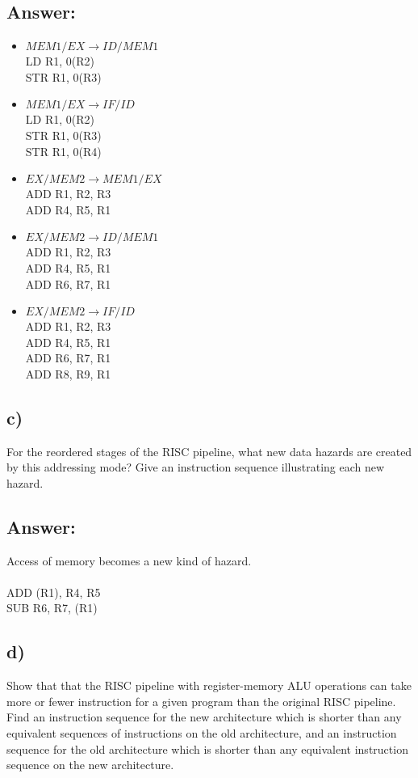 \documentclass[letter,11pt,leqno]{article}
\begin{document}
\subsection*{Answer:}

\begin{itemize}
\item $MEM1/EX\to{}ID/MEM1$\\
LD R1, 0(R2)\\
STR R1, 0(R3)

\item $MEM1/EX\to{}IF/ID$\\
LD R1, 0(R2)\\
STR R1, 0(R3)\\
STR R1, 0(R4)

\item $EX/MEM2\to{}MEM1/EX$\\
ADD R1, R2, R3\\
ADD R4, R5, R1

\item $EX/MEM2\to{}ID/MEM1$\\
ADD R1, R2, R3\\
ADD R4, R5, R1\\
ADD R6, R7, R1

\item $EX/MEM2\to{}IF/ID$\\
ADD R1, R2, R3\\
ADD R4, R5, R1\\
ADD R6, R7, R1\\
ADD R8, R9, R1
\end{itemize}

\subsection*{c)}For the reordered stages of the RISC pipeline, what new data hazards are created by this addressing mode? Give an instruction sequence illustrating each new hazard.

\subsection*{Answer:}
Access of memory becomes a new kind of hazard.\\
\\
ADD (R1), R4, R5\\
SUB R6, R7, (R1)

\subsection*{d)}Show that that the RISC pipeline with register-memory ALU operations can take more or fewer instruction for a given program than the original RISC pipeline. Find an instruction sequence for the new architecture which is shorter than any equivalent sequences of instructions on the old architecture, and an instruction sequence for the old architecture which is shorter than any equivalent instruction sequence on the new architecture.
\end{document}
